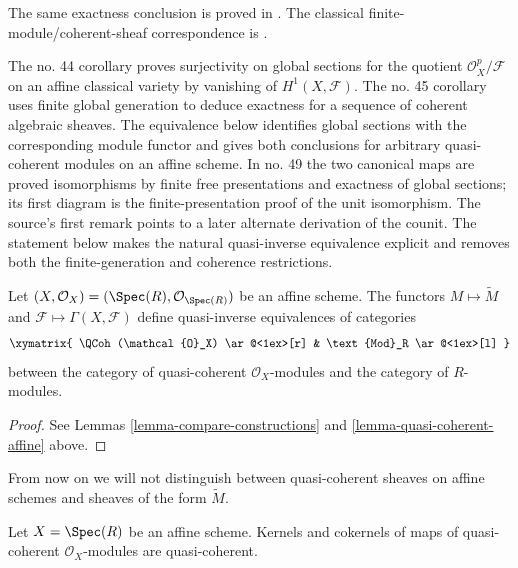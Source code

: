 \begin{lemma}
\label{lemma-equivalence-quasi-coherent}
\begin{reference}
\cite[Chapter II, \S 3, no. 44, Proposition 7, Corollary 2,
p. 237]{FAC}
The same exactness conclusion is proved in
\cite[Chapter II, \S 3, no. 45, Theorem 2, Corollary 2,
p. 238]{FAC}.
The classical finite-module/coherent-sheaf correspondence is
\cite[Chapter II, \S 4, no. 49, Theorem 1, pp. 241--242]{FAC}.
\end{reference}
\begin{history}
The no. 44 corollary proves surjectivity on global sections for the quotient
$\mathcal{O}_X^p/\mathcal{F}$ on an affine classical variety by vanishing of
$H^1(X,\mathcal{F})$. The no. 45 corollary uses finite global generation to
deduce exactness for a sequence of coherent algebraic sheaves. The equivalence
below identifies global sections with the corresponding module functor and
gives both conclusions for arbitrary quasi-coherent modules on an affine
scheme. In no. 49 the two canonical maps are proved isomorphisms by finite
free presentations and exactness of global sections; its first diagram is the
finite-presentation proof of the unit isomorphism. The source's first remark
points to a later alternate derivation of the counit. The statement below
makes the natural quasi-inverse equivalence explicit and removes both the
finite-generation and coherence restrictions.
\end{history}
Let $(X, \mathcal{O}_X) = (\Spec(R), \mathcal{O}_{\Spec(R)})$
be an affine scheme.
The functors $M \mapsto \widetilde M$ and
$\mathcal{F} \mapsto \Gamma(X, \mathcal{F})$ define quasi-inverse
equivalences of categories
$$
\xymatrix{
\QCoh(\mathcal{O}_X)
\ar@<1ex>[r]
&
\text{Mod}_R
\ar@<1ex>[l]
}
$$
between the category of quasi-coherent $\mathcal{O}_X$-modules
and the category of $R$-modules.
\end{lemma}

\begin{proof}
See Lemmas \ref{lemma-compare-constructions}
and \ref{lemma-quasi-coherent-affine} above.
\end{proof}

\noindent
From now on we will not distinguish between quasi-coherent
sheaves on affine schemes and sheaves of the form $\widetilde M$.

\begin{lemma}
\label{lemma-kernel-cokernel-quasi-coherent}
Let $X = \Spec(R)$ be an affine scheme.
Kernels and cokernels of maps of quasi-coherent
$\mathcal{O}_X$-modules are quasi-coherent.
\end{lemma}

